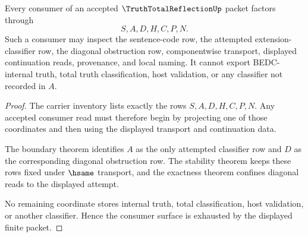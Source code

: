 \begin{theorem}
\label{thm:truth-total-reflection-consumer-surface-exhaustion}
Every consumer of an accepted $\TruthTotalReflectionUp$ packet factors through
$$
S,A,D,H,C,P,N.
$$
Such a consumer may inspect the sentence-code row, the attempted extension-classifier row, the diagonal obstruction row, componentwise transport, displayed continuation reads, provenance, and local naming. It cannot export BEDC-internal truth, total truth classification, host validation, or any classifier not recorded in $A$.
\end{theorem}
\begin{proof}
The carrier inventory lists exactly the rows $S,A,D,H,C,P,N$. Any accepted consumer read must therefore begin by projecting one of those coordinates and then using the displayed transport and continuation data.

The boundary theorem identifies $A$ as the only attempted classifier row and $D$ as the corresponding diagonal obstruction row. The stability theorem keeps these rows fixed under $\hsame$ transport, and the exactness theorem confines diagonal reads to the displayed attempt.

No remaining coordinate stores internal truth, total classification, host validation, or another classifier. Hence the consumer surface is exhausted by the displayed finite packet.
\end{proof}

